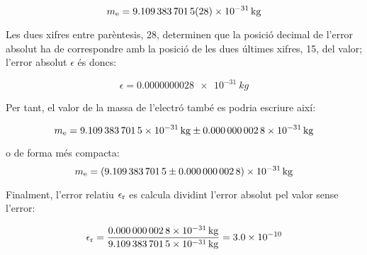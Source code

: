 \[
    m_\mathrm{e} = \qty{9,109 383 7015(28) e-31}{kg}
\]

Les dues xifres entre parèntesis, 28, determinen que la posició decimal de l'error absolut ha de correspondre amb la posició de les dues últimes xifres, 15, del valor; l'error absolut $\epsilon$  és doncs:

\[
    \epsilon = \qty{0,000 000 0028 e-31}{kg}
\]

Per tant, el valor de la massa de l'electró també es podria escriure així:

 \[
    m\ped{e} = \qty[separate-uncertainty,separate-uncertainty-units = repeat]{9,109 383 7015(28) e-31}{kg}
\]

o de forma més compacta:
\[
m\ped{e} = \qty[separate-uncertainty,separate-uncertainty-units = bracket]{9,109 383 7015(28) e-31}{kg}
\]

Finalment, l'error relatiu $\epsilon_\mathrm{r}$ es calcula dividint l'error absolut pel valor sense l'error:

\[
    \epsilon_\mathrm{r} = \frac{\qty{0,000 000 0028 e-31}{kg}}{\qty{9,109 383 7015 e-31}{kg}} =   \num{3,0e-10}
\]
